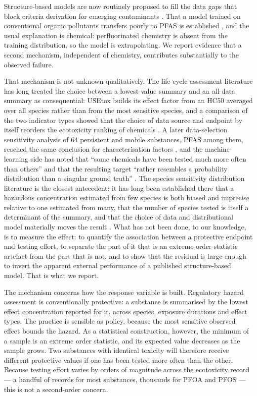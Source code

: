 \documentclass[preprint,12pt]{elsarticle}
\begin{document}
Structure-based models are now routinely proposed to fill the data gaps that
block criteria derivation for emerging contaminants
\cite{liang2025datagaps,anand2024grape,khan2019ecotoxqsar}. That a model trained
on conventional organic pollutants transfers poorly to PFAS is established
\cite{cheng2019mlpfas}, and the usual explanation is chemical:
perfluorinated chemistry is absent from the training distribution, so the model
is extrapolating. We report evidence that a second mechanism, independent
of chemistry, contributes substantially to the observed failure.

That mechanism is not unknown qualitatively. The life-cycle assessment
literature has long treated the choice between a lowest-value summary and an
all-data summary as consequential: USEtox builds its effect factor from an
HC50 averaged over all species rather than from the most sensitive species,
and a comparison of the two indicator types showed that the choice of data
source and endpoint by itself reorders the ecotoxicity ranking of chemicals
\cite{saouter2017usetox}. A later data-selection sensitivity analysis of 64
persistent and mobile substances, PFAS among them, reached the same conclusion
for characterisation factors \cite{aggarwal2024cfpm}, and the machine-learning
side has
noted that ``some chemicals have been tested much more often than others'' and
that the resulting target ``rather resembles a probability distribution than a
singular ground truth'' \cite{schur2023adore}. The species sensitivity
distribution literature is the closest antecedent: it has long been established
there that a hazardous concentration estimated from few species is both biased
and imprecise relative to one estimated from many, that the number of species
tested is itself a determinant of the summary, and that the choice of data and
distributional model materially moves the result
\cite{newman2000ssd,aldenberg2000hcunc,wheeler2002ssd,wang2008hc5}. What has
not been done, to our knowledge, is to measure the effect: to quantify the association between a
protective endpoint and testing effort, to separate the part of it that is an
extreme-order-statistic artefact from the part that is not, and to show that the
residual is large enough to invert the apparent external performance of a
published structure-based model. That is what we report.

The mechanism concerns how the response variable is built. Regulatory hazard
assessment is conventionally protective: a substance is summarised by the lowest
effect concentration reported for it, across species, exposure durations and
effect types. The practice is sensible as policy, because the most sensitive
observed effect bounds the hazard. As a statistical construction, however, the
minimum of a sample is an extreme order statistic, and its expected value
decreases as the sample grows. Two substances with identical toxicity will
therefore receive different protective values if one has been tested more often
than the other. Because testing effort varies by orders of magnitude across the
ecotoxicity record --- a handful of records for most substances, thousands for
PFOA and PFOS --- this is not a second-order concern.
\end{document}
